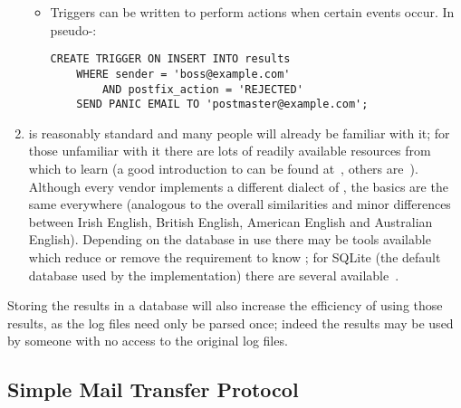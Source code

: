 \begin{enumerate}
\begin{itemize}
            \item Triggers can be written to perform actions when certain
                events occur.  In pseudo-\SQL{}\@:

\begin{verbatim}
CREATE TRIGGER ON INSERT INTO results
    WHERE sender = 'boss@example.com'
        AND postfix_action = 'REJECTED'
    SEND PANIC EMAIL TO 'postmaster@example.com';
\end{verbatim}

        \end{itemize}


    \item \SQL{} is reasonably standard and many people will already be
        familiar with it; for those unfamiliar with it there are lots of
        readily available resources from which to learn (a good
        introduction to \SQL{} can be found at~\cite{sql-for-web-nerds},
        others are~\cite{w3schools-sql-tutorial, sqlcourse.com}).  Although
        every vendor implements a different dialect of \SQL{}, the basics
        are the same everywhere (analogous to the overall similarities and
        minor differences between Irish English, British English, American
        English and Australian English).  Depending on the database in use
        there may be tools available which reduce or remove the requirement
        to know \SQL{}; for SQLite (the default database used by the
        implementation) there are several available~\cite{sqlite-guis}.

\end{enumerate}

Storing the results in a database will also increase the efficiency of
using those results, as the log files need only be parsed once; indeed the
results may be used by someone with no access to the original log files.



\subsection{Simple Mail Transfer Protocol}
\label{SMTP background}

